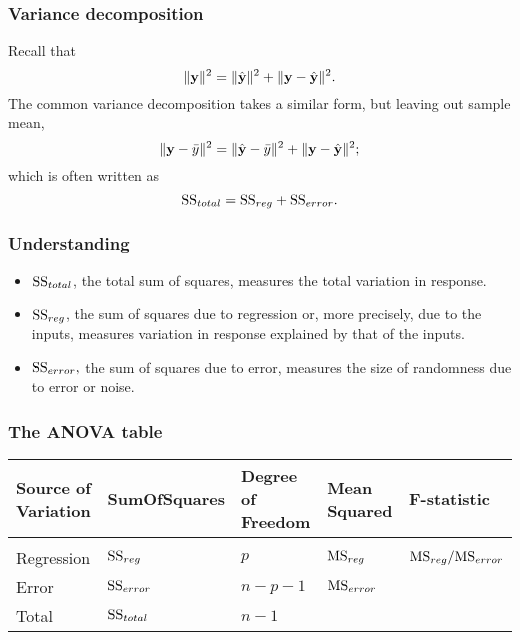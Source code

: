 \documentclass{beamer}
\begin{document}
      \begin{frame}
      	\frametitle{Variance decomposition }
      	
      	Recall that
      	$$ \| {\bf y}\|^2  = \|\hat {\bf y}\|^2 + \|{\bf y} - \hat {\bf y}\|^2.$$
      	The common variance decomposition takes a similar form, but leaving out sample mean,  
      	$$ \| {\bf y} - \bar y \|^2  = \|\hat {\bf y} - \bar y \|^2 + \|{\bf y} - \hat {\bf y}\|^2;
      	$$
      	which is often written as
      	$$ \hbox{SS}_{total} = \hbox{SS}_{reg} + \hbox{SS}_{error}.$$
      	
      	
      \end{frame}
      
      
      
      
      \begin{frame}
      	\frametitle{Understanding}
      	\begin{itemize}
      		\item $ \hbox{SS}_{total}  $, the total sum of squares,  measures the total variation in response.
      		
      		\item $  \hbox{SS}_{reg}  $,
      		the sum of squares due to regression or, more precisely, due to
      		the inputs, measures variation in  response explained by that of the inputs.
      		
      		\item $   \hbox{SS}_{error},$ 
      		the sum of squares due to error, measures the size of randomness due to error or
      		noise. 
      		
      	\end{itemize}
      \end{frame}
      
      \begin{frame}
      	\frametitle{The ANOVA table}
      	
      	\begin{center}
      		\begin{adjustbox}{width=1\textwidth}
      			\small
      			\begin{tabular}{lllll}
      				Source of Variation & SumOfSquares & Degree of Freedom & Mean Squared & F-statistic \\
      				\hline \\
      				Regression  &$\hbox{SS}_{reg}$  & $ p$  & $\hbox{MS}_{reg}$  & $\hbox{MS}_{reg}/\hbox{MS}_{error}$ \\
      				Error       &$\hbox{SS}_{error}$ & $n-p-1$  & $\hbox{MS}_{error}  $ &  \\
      				Total       &$\hbox{SS}_{total}$ & $n-1$  &    &  \\
      			\end{tabular}
      		\end{adjustbox}
      	\end{center}
      \end{frame}
      
\end{document}
